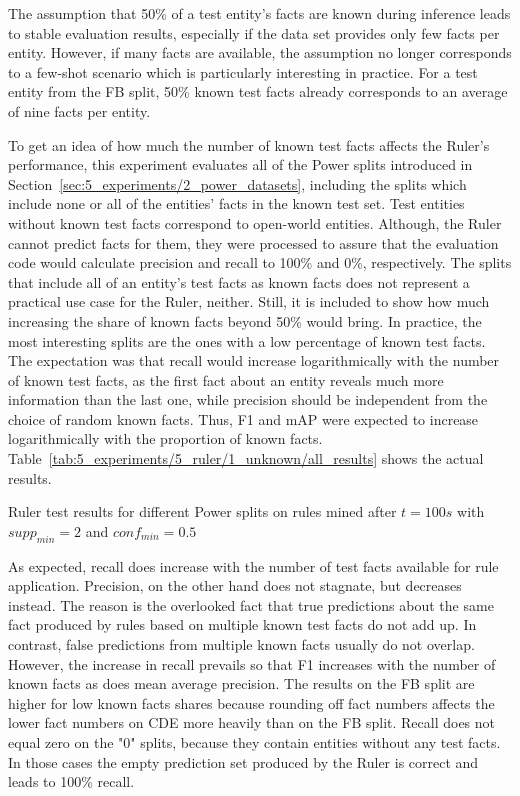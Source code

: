 The assumption that 50\% of a test entity's facts are known during inference leads to stable evaluation results, especially if the data set provides only few facts per entity. However, if many facts are available, the assumption no longer corresponds to a few-shot scenario which is particularly interesting in practice. For a test entity from the FB split, 50\% known test facts already corresponds to an average of nine facts per entity.

To get an idea of how much the number of known test facts affects the Ruler's performance, this experiment evaluates all of the Power splits introduced in Section~\ref{sec:5_experiments/2_power_datasets}, including the splits which include none or all of the entities' facts in the known test set. Test entities without known test facts correspond to open-world entities. Although, the Ruler cannot predict facts for them, they were processed to assure that the evaluation code would calculate precision and recall to 100\% and 0\%, respectively. The splits that include all of an entity's test facts as known facts does not represent a practical use case for the Ruler, neither. Still, it is included to show how much increasing the share of known facts beyond 50\% would bring. In practice, the most interesting splits are the ones with a low percentage of known test facts. The expectation was that recall would increase logarithmically with the number of known test facts, as the first fact about an entity reveals much more information than the last one, while precision should be independent from the choice of random known facts. Thus, F1 and mAP were expected to increase logarithmically with the proportion of known facts. Table~\ref{tab:5_experiments/5_ruler/1_unknown/all_results} shows the actual results.

\begin{table}
    \centering
    
    \caption{Ruler test results for different Power splits on rules mined after $t = 100s$ with $supp_{min} = 2$ and $conf_{min} = 0.5$}
    \label{tab:5_experiments/5_ruler/1_unknown/all_results}
\end{table}

As expected, recall does increase with the number of test facts available for rule application. Precision, on the other hand does not stagnate, but decreases instead. The reason is the overlooked fact that true predictions about the same fact produced by rules based on multiple known test facts do not add up. In contrast, false predictions from multiple known facts usually do not overlap. However, the increase in recall prevails so that F1 increases with the number of known facts as does mean average precision. The results on the FB split are higher for low known facts shares because rounding off fact numbers affects the lower fact numbers on CDE more heavily than on the FB split. Recall does not equal zero on the "0" splits, because they contain entities without any test facts. In those cases the empty prediction set produced by the Ruler is correct and leads to 100\% recall.
